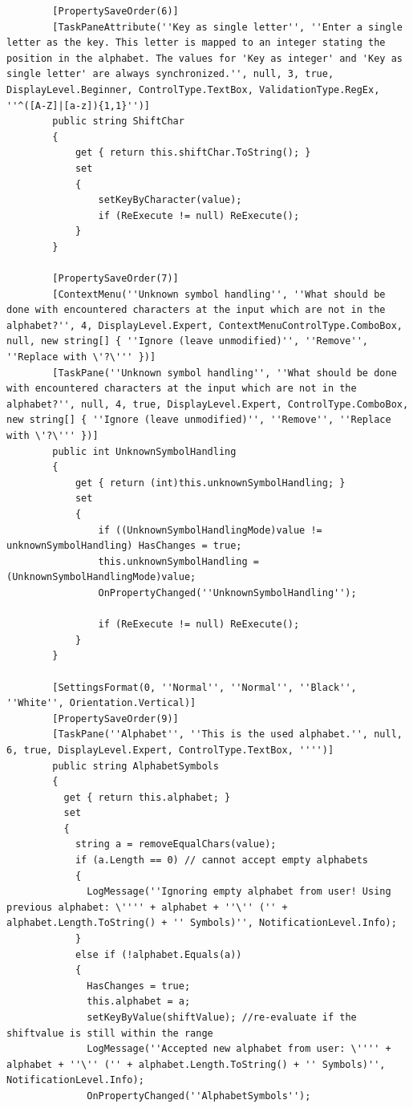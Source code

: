 \begin{lstlisting}
        [PropertySaveOrder(6)]
        [TaskPaneAttribute(''Key as single letter'', ''Enter a single letter as the key. This letter is mapped to an integer stating the position in the alphabet. The values for 'Key as integer' and 'Key as single letter' are always synchronized.'', null, 3, true, DisplayLevel.Beginner, ControlType.TextBox, ValidationType.RegEx, ''^([A-Z]|[a-z]){1,1}'')]
        public string ShiftChar
        {
            get { return this.shiftChar.ToString(); }
            set
            {
                setKeyByCharacter(value);
                if (ReExecute != null) ReExecute();
            }
        }

        [PropertySaveOrder(7)]
        [ContextMenu(''Unknown symbol handling'', ''What should be done with encountered characters at the input which are not in the alphabet?'', 4, DisplayLevel.Expert, ContextMenuControlType.ComboBox, null, new string[] { ''Ignore (leave unmodified)'', ''Remove'', ''Replace with \'?\''' })]
        [TaskPane(''Unknown symbol handling'', ''What should be done with encountered characters at the input which are not in the alphabet?'', null, 4, true, DisplayLevel.Expert, ControlType.ComboBox, new string[] { ''Ignore (leave unmodified)'', ''Remove'', ''Replace with \'?\''' })]
        public int UnknownSymbolHandling
        {
            get { return (int)this.unknownSymbolHandling; }
            set
            {
                if ((UnknownSymbolHandlingMode)value != unknownSymbolHandling) HasChanges = true;
                this.unknownSymbolHandling = (UnknownSymbolHandlingMode)value;
                OnPropertyChanged(''UnknownSymbolHandling'');

                if (ReExecute != null) ReExecute();
            }
        }

        [SettingsFormat(0, ''Normal'', ''Normal'', ''Black'', ''White'', Orientation.Vertical)]
        [PropertySaveOrder(9)]
        [TaskPane(''Alphabet'', ''This is the used alphabet.'', null, 6, true, DisplayLevel.Expert, ControlType.TextBox, '''')]
        public string AlphabetSymbols
        {
          get { return this.alphabet; }
          set
          {
            string a = removeEqualChars(value);
            if (a.Length == 0) // cannot accept empty alphabets
            {
              LogMessage(''Ignoring empty alphabet from user! Using previous alphabet: \'''' + alphabet + ''\'' ('' + alphabet.Length.ToString() + '' Symbols)'', NotificationLevel.Info);
            }
            else if (!alphabet.Equals(a))
            {
              HasChanges = true;
              this.alphabet = a;
              setKeyByValue(shiftValue); //re-evaluate if the shiftvalue is still within the range
              LogMessage(''Accepted new alphabet from user: \'''' + alphabet + ''\'' ('' + alphabet.Length.ToString() + '' Symbols)'', NotificationLevel.Info);
              OnPropertyChanged(''AlphabetSymbols'');


\end{lstlisting}
